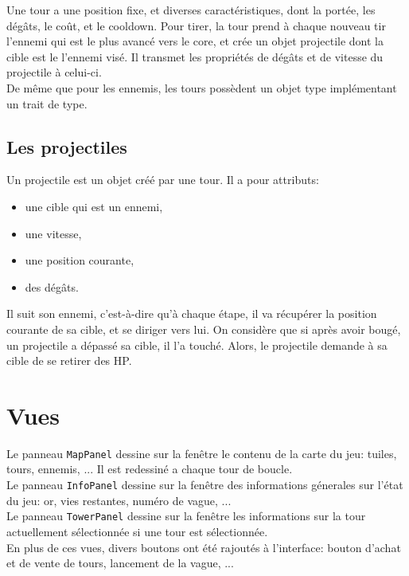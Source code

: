 \documentclass[a4paper,11pt]{article}
\begin{document}
Une tour a une position fixe, et diverses caractéristiques, dont la portée, les
dégâts, le coût, et le cooldown. Pour tirer, la tour prend à chaque nouveau tir
l'ennemi qui est le plus avancé vers le core, et crée un objet projectile dont
la cible est le l'ennemi visé. Il transmet les propriétés de dégâts et de vitesse
du projectile à celui-ci. \\

\noindent De m\^eme que pour les ennemis, les tours poss\`edent un objet type
impl\'ementant un trait de type.

\subsection{Les projectiles}

Un projectile est un objet créé par une tour. Il a pour attributs:
\begin{itemize}
    \item une cible qui est un ennemi,
    \item une vitesse,
    \item une position courante,
    \item des dégâts.
\end{itemize}

Il suit son ennemi, c'est-à-dire qu'à chaque étape, il va récupérer la position
courante de sa cible, et se diriger vers lui. On considère que si après avoir bougé,
un projectile a dépassé sa cible, il l'a touché. Alors, le projectile demande à
sa cible de se retirer des HP.

\section{Vues}

Le panneau \texttt{MapPanel} dessine sur la fen\^etre le contenu de la carte du
jeu: tuiles, tours, ennemis, ... Il est redessin\'e a chaque tour de boucle. \\

\noindent Le panneau \texttt{InfoPanel} dessine sur la fen\^etre des informations g\'enerales
sur l'\'etat du jeu: or, vies restantes, num\'ero de vague, ... \\

\noindent Le panneau \texttt{TowerPanel} dessine sur la fen\^etre les informations sur
la tour actuellement s\'electionn\'ee si une tour est s\'electionn\'ee. \\

\noindent En plus de ces vues, divers boutons ont \'et\'e rajout\'es \`a
l'interface: bouton d'achat et de vente de tours, lancement de la vague, ...
\end{document}
